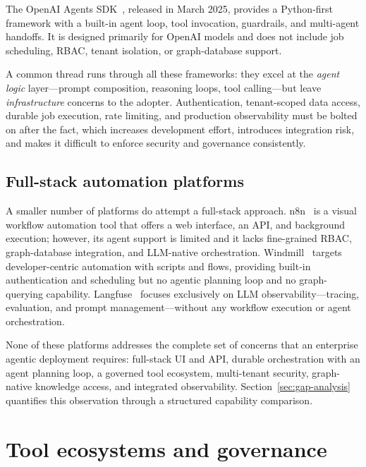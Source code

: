 \documentclass[a4paper]{sapthesis}
\begin{document}
The OpenAI Agents SDK~\cite{openaiagentssdk2025}, released in March 2025,
provides a Python-first framework with a built-in agent loop, tool
invocation, guardrails, and multi-agent handoffs.  It is designed primarily
for OpenAI models and does not include job scheduling, RBAC, tenant
isolation, or graph-database support.

A common thread runs through all these frameworks: they excel at the
\emph{agent logic} layer---prompt composition, reasoning loops, tool
calling---but leave \emph{infrastructure} concerns to the adopter.
Authentication, tenant-scoped data access, durable job execution, rate
limiting, and production observability must be bolted on after the fact,
which increases development effort, introduces integration risk, and makes
it difficult to enforce security and governance consistently.

\subsection{Full-stack automation platforms}

A smaller number of platforms do attempt a full-stack approach.
n8n~\cite{n8n2023} is a visual workflow automation tool that offers a web
interface, an API, and background execution; however, its agent support is
limited and it lacks fine-grained RBAC, graph-database integration, and
LLM-native orchestration.  Windmill~\cite{windmill2023} targets
developer-centric automation with scripts and flows, providing built-in
authentication and scheduling but no agentic planning loop and no
graph-querying capability.  Langfuse~\cite{langfuse2023} focuses
exclusively on LLM observability---tracing, evaluation, and prompt
management---without any workflow execution or agent orchestration.

None of these platforms addresses the complete set of concerns that an
enterprise agentic deployment requires: full-stack UI and API, durable
orchestration with an agent planning loop, a governed tool ecosystem,
multi-tenant security, graph-native knowledge access, and integrated
observability.  Section~\ref{sec:gap-analysis} quantifies this observation
through a structured capability comparison.

\section{Tool ecosystems and governance}
\label{sec:tool-ecosystems}
\end{document}
